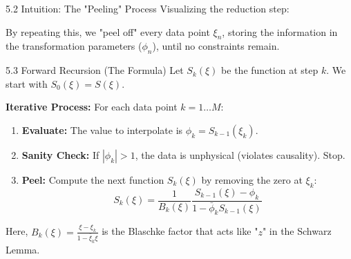 \documentclass[aspectratio=169, 11pt]{beamer}
\begin{document}
\begin{frame}{5.2 Intuition: The "Peeling" Process}
    Visualizing the reduction step:
    
    \centering
    
    \vspace{0.5cm}
    By repeating this, we "peel off" every data point $\xi_n$, storing the information in the transformation parameters ($\phi_n$), until no constraints remain.
\end{frame}

\begin{frame}{5.3 Forward Recursion (The Formula)}
    Let $S_k(\xi)$ be the function at step $k$. We start with $S_0(\xi) = S(\xi)$.
    
    \textbf{Iterative Process:}
    For each data point $k = 1 \dots M$:
    \begin{enumerate}
        \item \textbf{Evaluate:} The value to interpolate is $\phi_k = S_{k-1}(\xi_k)$.
        \item \textbf{Sanity Check:} If $|\phi_k| > 1$, the data is unphysical (violates causality). Stop.
        \item \textbf{Peel:} Compute the next function $S_k(\xi)$ by removing the zero at $\xi_k$:
        $$ S_k(\xi) = \frac{1}{B_k(\xi)} \frac{S_{k-1}(\xi) - \phi_k}{1 - \bar{\phi}_k S_{k-1}(\xi)} $$
    \end{enumerate}
    
    Here, $B_k(\xi) = \frac{\xi - \xi_k}{1 - \bar{\xi}_k \xi}$ is the Blaschke factor that acts like "$z$" in the Schwarz Lemma.
\end{frame}
\end{document}
